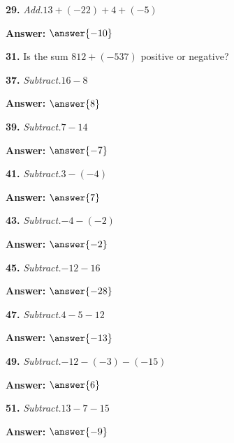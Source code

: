 \documentclass{ximera}
\begin{document}
\begin{problem}
\textbf{29.} \emph{Add.}\quad $13 + (-22) + 4 + (-5)$

\textbf{Answer:} $\answer{-10}$
\end{problem}

\begin{problem}
\textbf{31.} Is the sum $812 + (-537)$ positive or negative?

\begin{multipleChoice}
\end{multipleChoice}
\end{problem}

\begin{problem}
\textbf{37.} \emph{Subtract.}\quad $16 - 8$

\textbf{Answer:} $\answer{8}$
\end{problem}

\begin{problem}
\textbf{39.} \emph{Subtract.}\quad $7 - 14$

\textbf{Answer:} $\answer{-7}$
\end{problem}

\begin{problem}
\textbf{41.} \emph{Subtract.}\quad $3 - (-4)$

\textbf{Answer:} $\answer{7}$
\end{problem}

\begin{problem}
\textbf{43.} \emph{Subtract.}\quad $-4 - (-2)$

\textbf{Answer:} $\answer{-2}$
\end{problem}

\begin{problem}
\textbf{45.} \emph{Subtract.}\quad $-12 - 16$

\textbf{Answer:} $\answer{-28}$
\end{problem}

\begin{problem}
\textbf{47.} \emph{Subtract.}\quad $4 - 5 - 12$

\textbf{Answer:} $\answer{-13}$
\end{problem}

\begin{problem}
\textbf{49.} \emph{Subtract.}\quad $-12 - (-3) - (-15)$

\textbf{Answer:} $\answer{6}$
\end{problem}

\begin{problem}
\textbf{51.} \emph{Subtract.}\quad $13 - 7 - 15$

\textbf{Answer:} $\answer{-9}$
\end{problem}
\end{document}
